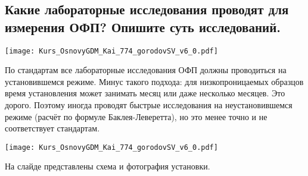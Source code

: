 

\subsection{Какие лабораторные исследования проводят для измерения ОФП? Опишите суть исследований.}

\texttt{[image: Kurs\_OsnovyGDM\_Kai\_774\_gorodovSV\_v6\_0.pdf]}

По стандартам все лабораторные исследования ОФП должны проводиться на установившемся режиме.
Минус такого подхода: для низкопроницаемых образцов время установления может занимать месяц или даже несколько месяцев.
Это дорого.
Поэтому иногда проводят быстрые исследования на неустановившемся режиме (расчёт по формуле Баклея-Леверетта), но это менее точно и не соответствует стандартам.

\texttt{[image: Kurs\_OsnovyGDM\_Kai\_774\_gorodovSV\_v6\_0.pdf]}

На слайде представлены схема и фотография установки.

